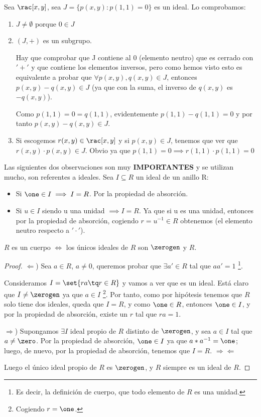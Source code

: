 \begin{example} Sea $\rac[x,y]$, sea $J=\{p(x,y): p(1,1)=0\}$ es un ideal. Lo comprobamos:
\begin{enumerate}
	\item $J \neq \emptyset$ porque $0 \in J$
	\item $(J,+)$ es un subgrupo.

	Hay que comprobar que J contiene al 0 (elemento neutro) que es cerrado con $'+'$ y que contiene los elementos inversos, pero como hemos visto esto es equivalente a probar que $\forall p(x,y), q(x,y) \in J$, entonces $p(x,y)-q(x,y) \in J$ (ya que con la suma, el inverso de $q(x,y)$ es $-q(x,y)$).

	Como $p(1,1)=0=q(1,1)$, evidentemente $p(1,1)-q(1,1)=0$ y por tanto $p(x,y)-q(x,y) \in J$.
	\item Si escogemos $r(x,y) \in \rac[x,y]$ y si $p(x,y) \in J$, tenemos que ver que $r(x,y)\cdot p(x,y) \in J$. Obvio ya que $p(1,1)=0 \implies r(1,1)\cdot p(1,1) = 0$
\end{enumerate}
\end{example}

Las siguientes dos observaciones son muy \textbf{IMPORTANTES} y se utilizan mucho, son referentes a ideales. Sea $I \subseteq R$ un ideal de un anillo R:
\begin{itemize}
	\item Si $\one \in I \implies I=R$. Por la propiedad de absorción.
	\item Si $u\in I$ siendo u una unidad $\implies I=R$. Ya que si u es una unidad, entonces por la propiedad de absorción, cogiendo $r=u^{-1} \in R$ obtenemos \one (el elemento neutro respecto a $'\cdot'$).
\end{itemize}
\begin{prop}
	$R$ es un cuerpo $\iff$ los únicos ideales de $R$ son $\zerogen$ y $R$.
\end{prop}
\begin{proof}

	$\Leftarrow$) Sea $a \in R$, $a \neq 0$, queremos probar que $\exists a' \in R$ tal que $aa' = 1$ \footnote{Es decir, la definición de cuerpo, que todo elemento de $R$ es una unidad.}.

	Consideramos $I=\set{ra \tq r \in R}$ y vamos a ver que es un ideal. Está claro que $I \neq \zerogen$ ya que $a \in I$ \footnote{Cogiendo $r = \one$.}. Por tanto, como por hipótesis tenemos que $R$ solo tiene dos ideales, queda que $I=R$, y como $\one \in R$, entonces $\one \in I$, y por la propiedad de absorción, existe un $r$ tal que $ra=1$.

	$\Rightarrow$) Supongamos $\exists I$ ideal propio de $R$ distinto de $\zerogen$, y sea $a \in I$ tal que $a \neq \zero$. Por la propiedad de absorción, $\one \in I$ ya que $a*a^{-1} = \one$; luego, de nuevo, por la propiedad de absorción, tenemos que $I = R$. $\Rightarrow\Leftarrow$

	Luego el único ideal propio de $R$ es $\zerogen$, y $R$ siempre es un ideal de $R$.
\end{proof}

